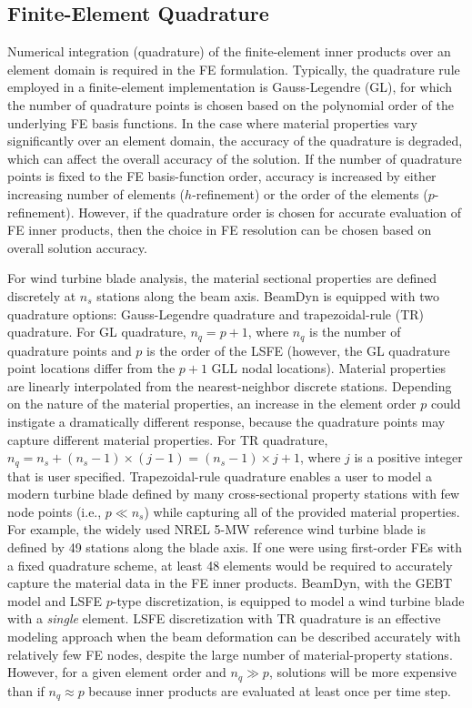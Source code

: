 \documentclass{aiaa-tc}
\begin{document}
\subsection{Finite-Element Quadrature}
\label{sec:quad}

Numerical integration (quadrature) of the finite-element inner products over an element domain is required in the FE formulation.   
Typically, the quadrature rule employed in a finite-element implementation is Gauss-Legendre (GL), for which the number of quadrature points is chosen based on the polynomial order of the underlying FE basis functions.  
In the case where material properties vary significantly over an element domain, the accuracy of the quadrature is degraded, which can affect the overall accuracy of the solution.   If the number of quadrature points is fixed to the FE basis-function order, accuracy is increased by either increasing number of elements ($h$-refinement) or the order of the elements ($p$-refinement).  However, if the quadrature order is chosen for accurate evaluation of FE inner products, then the choice in FE resolution can be chosen based on overall solution accuracy.

For wind turbine blade analysis, the material sectional properties are defined discretely at $n_s$ stations along the beam axis.
BeamDyn is equipped with two quadrature options: Gauss-Legendre quadrature and trapezoidal-rule (TR) quadrature.  
For GL quadrature, $n_q= p + 1$, where $n_q$ is the number of quadrature points and $p$ is the order of the LSFE  (however, the GL quadrature point locations differ from the $p+1$ GLL nodal locations).  Material properties are linearly interpolated from the nearest-neighbor discrete stations. 
Depending on the nature of the material properties, an increase in the element order $p$ could instigate a dramatically different response, because the quadrature points may capture different material properties.
For TR quadrature, $n_q = n_s + (n_s-1) \times (j-1)
= ( n_s - 1 ) \times j + 1$, where $j$ is a positive integer that is user specified. 
Trapezoidal-rule quadrature enables a user to model a modern turbine blade defined by many cross-sectional property stations with few node points (i.e., $p \ll n_s$) while capturing all of the provided material properties.
For example, 
the widely used NREL 5-MW reference wind turbine\cite{Jonkman-etal:2009} blade is defined by 49 stations along the blade axis.   If one were using first-order FEs with a fixed quadrature scheme, at least 48 elements would be required to accurately capture the material data in the FE inner products.
BeamDyn, with the GEBT model and LSFE $p$-type discretization, is equipped to model a wind turbine blade with a \textit{single} element.  
LSFE discretization with TR quadrature 
is an effective modeling approach when the beam deformation can be described accurately with relatively few FE nodes, despite the large number of material-property stations.    However, for a given element order and $n_q \gg p$, solutions will be more expensive than if $n_q \approx p$ because inner products are evaluated at least once per time step. 
\end{document}
